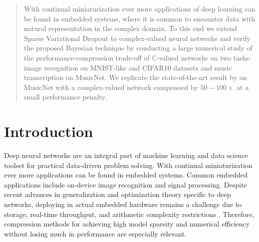 \documentclass{article}
\newcommand{\cplx}{\mathbb{C}}
\begin{document}
\printAffiliationsAndNotice{}  %

\begin{abstract}
With continual miniaturization ever more applications of deep learning can be found
in embedded systems, where it is common to encounter data with natural representation
in the complex domain. To this end we extend Sparse Variational Dropout to complex-valued
neural networks and verify the proposed Bayesian technique by conducting a large numerical
study of the performance-compression trade-off of $\cplx$-valued networks on two tasks:
image recognition on MNIST-like and CIFAR10 datasets and music transcription on MusicNet.
We replicate the state-of-the-art result by \citet{trabelsi_deep_2018} on MusicNet with
a complex-valued network compressed by $50-100\times$ at a small performance penalty.
\end{abstract}

\section{Introduction} %
\label{sec:introduction}

Deep neural networks are an integral part of machine learning and data science toolset
for practical data-driven problem solving. With continual miniaturization ever more
applications can be found in embedded systems. Common embedded applications include
on-device image recognition and signal processing. Despite recent advances in generalization
and optimization theory specific to deep networks, deploying in actual embedded hardware
remains a challenge due to storage, real-time throughput, and arithmetic complexity
restrictions \citep{han_learning_2015}. Therefore, compression methods for achieving high
model sparsity and numerical efficiency without losing much in performance are especially
relevant.
\end{document}
